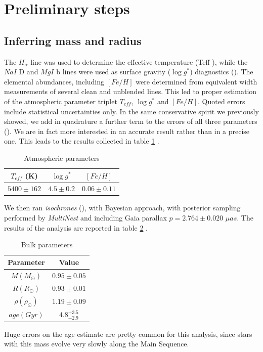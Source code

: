 \documentclass[a4paper,11pt,twocolumn]{article}
\begin{document}
\section{Preliminary steps}

\subsection{Inferring mass and radius}

The $H_{\alpha}$ line was used to determine the effective temperature (Teff ),
while the $NaI$ D and $MgI$ b lines were used as surface gravity
($\log{g^*}$) diagnostics (\cite{Anderson}). The elemental abundances, including $[Fe/H]$ 
were determined from equivalent width measurements of several clean and 
unblended lines. This led to proper estimation of the atmospheric parameter 
triplet $T_{eff}$, $\log{g^*}$ and $[Fe/H]$. Quoted errors include statistical 
uncertainties only. In the same conservative spirit we 
previously showed, we add in quadrature a further term to the errors of 
all three parameters (\cite{Sousa}). We are in fact more interested in an 
accurate result rather than in a precise one.
This leads to the results collected in table \ref{table:a} .
\begin{table}[H]
\centering
    \begin{tabular}{ccc}
    \hline
    $T_{eff}$ (K) & $\log{g^*}$ & $[Fe/H]$ \\
    \hline
    $5400 \pm 162$ & $4.5 \pm 0.2$ & $0.06 \pm 0.11$ \\
    \hline
    \end{tabular}
     \caption{Atmospheric parameters}
\label{table:a}
\end{table}
We then ran \textit{isochrones} (\cite{Morton}), with Bayesian approach, 
with posterior sampling performed by \textit{MultiNest} and including Gaia 
parallax $p=2.764 \pm 0.020$ $\mu as$. The results of the 
analysis are reported in table \ref{table:b} .
\begin{table}[h!]
\centering
    \begin{tabular}{cc}
    \hline
    Parameter & Value \\
    \hline
     $M (M_{\odot})$ &  $0.95\pm0.05$ \\
     $R (R_{\odot})$ & $0.93 \pm 0.01$  \\
     $\rho (\rho_{\odot})$ & $1.19 \pm 0.09$ \\
     $age (Gyr)$  & $4.8^{+3.5}_{-2.9}$ \\
    \hline
    \end{tabular}
\caption{Bulk parameters}
\label{table:b}
\end{table}
Huge errors on the age estimate are pretty common for this analysis, since 
stars with this mass evolve very slowly along the Main Sequence.
\end{document}
